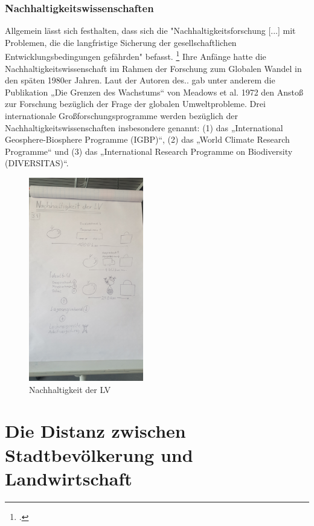 \documentclass{scrartcl}
\begin{document}
\subsubsection{Nachhaltigkeitswissenschaften}
Allgemein lässt sich festhalten, dass sich die "Nachhaltigkeitsforschung [...] mit Problemen, die die langfristige Sicherung der gesellschaftlichen Entwicklungsbedingungen gefährden" befasst.  \footcite[S.126]{MichelsenGrundlagenEntwicklung}
Ihre Anfänge hatte die Nachhaltigkeitswissenschaft im Rahmen der Forschung zum Globalen Wandel in den späten 1980er Jahren. Laut der Autoren des..  gab unter anderem die Publikation „Die Grenzen des Wachstums“ von Meadows et al. 1972 den Anstoß zur Forschung bezüglich der Frage der globalen Umweltprobleme.
Drei internationale Großforschungsprogramme werden bezüglich der Nachhaltigkeitswissenschaften insbesondere genannt: (1) das „International Geosphere-Biosphere Programme (IGBP)“, (2) das „World Climate Research Programme“ und (3) das
„International Research Programme on Biodiversity (DIVERSITAS)“.


\begin{figure}[h]
\centering
\includegraphics[width=5cm]{image_folder/skizze1.jpg}
\caption{Nachhaltigkeit der LV}
\label{fig:Skizze_Nachhaltigkeit}
\end{figure}

\FloatBarrier

\section{Die Distanz zwischen Stadtbevölkerung und Landwirtschaft}
\end{document}
